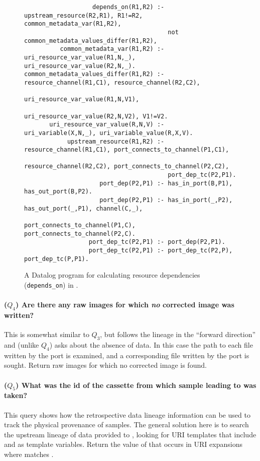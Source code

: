 \begin{figure*}[!t]
  \begin{footnotesize}
  \begin{verbatim}
                   depends_on(R1,R2) :- upstream_resource(R2,R1), R1!=R2, common_metadata_var(R1,R2), 
                                        not common_metadata_values_differ(R1,R2), 
          common_metadata_var(R1,R2) :- uri_resource_var_value(R1,N,_), uri_resource_var_value(R2,N,_).
common_metadata_values_differ(R1,R2) :- resource_channel(R1,C1), resource_channel(R2,C2), 
                                        uri_resource_var_value(R1,N,V1), 
                                        uri_resource_var_value(R2,N,V2), V1!=V2.
       uri_resource_var_value(R,N,V) :- uri_variable(X,N,_), uri_variable_value(R,X,V).
            upstream_resource(R1,R2) :- resource_channel(R1,C1), port_connects_to_channel(P1,C1), 
                                        resource_channel(R2,C2), port_connects_to_channel(P2,C2), 
                                        port_dep_tc(P2,P1).
                     port_dep(P2,P1) :- has_in_port(B,P1), has_out_port(B,P2).
                     port_dep(P2,P1) :- has_in_port(_,P2), has_out_port(_,P1), channel(C,_), 
                                        port_connects_to_channel(P1,C), port_connects_to_channel(P2,C).
                  port_dep_tc(P2,P1) :- port_dep(P2,P1).
                  port_dep_tc(P2,P1) :- port_dep_tc(P2,P), port_dep_tc(P,P1).
  \end{verbatim}
  \end{footnotesize}
  \caption{A Datalog program for calculating resource dependencies ({\tt depends\_on}) in \YW.}
  \label{fig:depends-on}
\end{figure*}

\paragraph{($Q_4$)
  Are there any raw images for which \emph{no} corrected image was written?}
This is somewhat similar to $Q_ 3$, but follows the lineage in the
``forward direction'' and (unlike $Q_4$) asks about the absence of
data.  In this case the path to each file written by the
 port is examined, and a corresponding file written
by the  port is sought.  Return raw images for
which no corrected image is found.

\paragraph{($Q_5$) What was the id of the cassette from which sample
  leading to  was taken?} This query
shows how the retrospective data lineage information can be used to
track the physical provenance of samples.  The general solution here
is to search the upstream lineage of data provided to
, looking for URI templates that include
 and  as template
variables. Return the value of  that occurs in URI
expansions where  matches .

